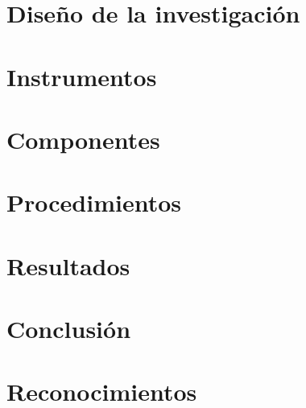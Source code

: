 \documentclass[journal]{IEEEtran}
\begin{document}
\section{Diseño de la investigación}


\section{Instrumentos}


\section{Componentes}


\section{Procedimientos}


\section{Resultados}


\section{Conclusión}




\section*{Reconocimientos}





\end{document}
